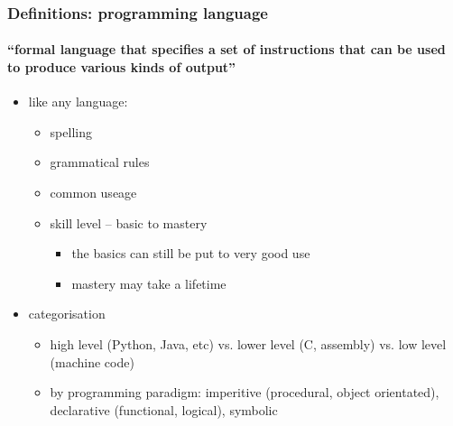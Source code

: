 \documentclass{beamer}
\begin{document}
    \begin{frame}
	    \frametitle{Definitions: programming language}
	    \framesubtitle{``formal language that specifies a set of instructions that can be used to produce various kinds of output''}
	    \begin{itemize}
		    \item like any language:
			    \begin{itemize}
				    \item spelling
				    \item grammatical rules
				    \item common useage
				    \item skill level -- basic to mastery 
					    \begin{itemize}
						    \item the basics can still be put to very good use
						    \item mastery may take a lifetime
					    \end{itemize}
			    \end{itemize}
			   \end{itemize}
			   \begin{itemize}
		    \item categorisation
			    \begin{itemize}
				    \item high level (Python, Java, etc) vs. lower level (C, assembly) vs. low level (machine code)
				    \item by programming paradigm: imperitive (procedural, object orientated), declarative (functional, logical), symbolic
			    \end{itemize} 
	    \end{itemize}
    \end{frame}
\end{document}
